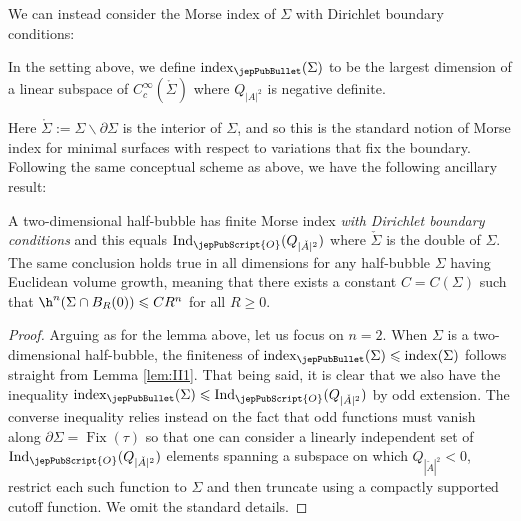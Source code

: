         
        	
        	We can instead consider the Morse index of $\Sigma$ with Dirichlet boundary conditions:
        	
        	\begin{definition} In the setting above, we define
        		$\operatorname{index}_{\jepPubBullet} (\Sigma)$ to be the largest dimension of a linear subspace of $C^{\infty}_c(\mathring{\Sigma})$ where $Q_{|A|^2}$ is negative definite.
        	\end{definition}
        	
        	Here $\mathring{\Sigma}:=\Sigma\smallsetminus\partial\Sigma$ is the interior of $\Sigma$, and so this is the standard notion of Morse index for minimal surfaces with respect to variations that fix the boundary. Following the same conceptual scheme as above, we have the following ancillary result:
        	
        	\begin{lem}\label{lem:II2}
        		A two-dimensional half-bubble has finite Morse index \emph{with Dirichlet boundary conditions} and this equals $\operatorname{Ind}_{{\jepPubScript{O}}}(Q_{|\check{A}|^2})$ where $\check{\Sigma}$ is the double of $\Sigma$.
        		The same conclusion holds true in all dimensions for any half-bubble $\Sigma$ having Euclidean volume growth, meaning that there exists a constant $C=C(\Sigma)$ such that $\h^n(\Sigma\cap B_R(0))\leqslant C R^n$ for all $R\geqslant 0$.
        	\end{lem}	
        	
        	\begin{proof}
        	Arguing as for the lemma above, let us focus on $n=2$. When $\Sigma$ is a two-dimensional half-bubble, the finiteness of $\operatorname{index}_{\jepPubBullet} (\Sigma)\leqslant \operatorname{index}(\Sigma)$ follows straight from Lemma \ref{lem:II1}. That being said, it is clear that we also have the inequality
        	$\operatorname{index}_{\jepPubBullet} (\Sigma)\leqslant \operatorname{Ind}_{{\jepPubScript{O}}}(Q_{|\check{A}|^2})$ by odd extension. The converse inequality
        	relies instead on the fact that odd functions must vanish along $\partial\Sigma=\operatorname{Fix}(\tau)$ so that one can consider a linearly independent set of $\operatorname{Ind}_{{\jepPubScript{O}}}(Q_{|\check{A}|^2})$ elements spanning a subspace on which $Q_{|\check{A}|^2}<0$, restrict each such function to $\Sigma$ and then truncate using a compactly supported cutoff function. We omit the standard details.
        		\end{proof}
        	
